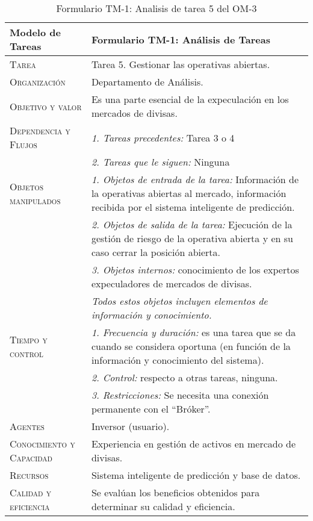 \begin{table}[H]
	\scriptsize
	\begin{tabularx}{\textwidth}{|l|X|} 
		\hline	
		\textbf{Modelo de Tareas} & \textbf{Formulario TM-1: Análisis de Tareas} \\ 
		\hline\hline
		\textsc{Tarea} & Tarea 5. Gestionar las operativas abiertas.\\ 
		\hline
		\textsc{Organización}  & Departamento de Análisis.\\ 
		\hline
		\textsc{Objetivo y valor} &  Es una parte esencial de la expeculación en los mercados de divisas.\\ 
		\hline
		\textsc{Dependencia y Flujos} & \textit{1. Tareas precedentes:} Tarea 3 o 4\\ &  \textit{2. Tareas que le siguen:} Ninguna \\
		\hline
		\textsc{Objetos manipulados} & \textit{1. Objetos de entrada de la tarea:} Información de la operativas abiertas al mercado, información recibida por el sistema inteligente de predicción.\\ & \textit{2. Objetos de salida de la tarea:} Ejecución de la gestión de riesgo de la operativa abierta y en su caso cerrar la posición abierta.\\  & \textit{3. Objetos internos:} conocimiento de los  expertos expeculadores de mercados de divisas. \\ & \emph{Todos estos objetos incluyen elementos de información y conocimiento.}\\
		\hline
		\textsc{Tiempo y control} & \textit{1. Frecuencia y duración:} es una tarea que se da cuando se considera  oportuna (en función de la información y conocimiento del sistema).\\ & \textit{2. Control:} respecto a otras  tareas, ninguna.\\ & \textit{3. Restricciones:} Se necesita una conexión permanente con el ``Bróker''. \\
		\hline
		\textsc{Agentes} & Inversor (usuario).\\
		\hline
		\textsc{Conocimiento y Capacidad} & Experiencia en gestión de activos en mercado de divisas. \\
		\hline
		\textsc{Recursos} & Sistema inteligente de predicción y  base de datos. \\
		\hline
		\textsc{Calidad y eficiencia} & Se evalúan los beneficios obtenidos para determinar su calidad y eficiencia. \\
		\hline
	\end{tabularx}
	\caption{\label{tab:TM1T4}Formulario TM-1: Analisis de tarea 5 del OM-3}
\end{table} 

